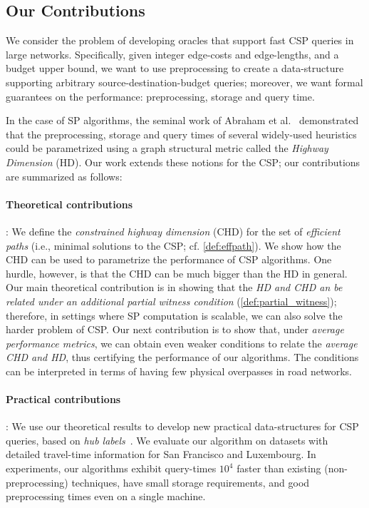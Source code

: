 \documentclass[opre,nonblindrev]{informs3} %
\begin{document}
\subsection{Our Contributions}
We consider the problem of developing oracles that support fast CSP queries in large networks. 
Specifically, given integer edge-costs and edge-lengths, and a budget upper bound, we want to use preprocessing to create a data-structure supporting arbitrary source-destination-budget queries; moreover, we want formal guarantees on the performance: preprocessing, storage and query time.

In the case of SP algorithms, the seminal work of Abraham et al.~\citep{highway2013, highway2010} demonstrated that the preprocessing, storage and query times of several widely-used heuristics could be parametrized using a graph structural metric called the \emph{Highway Dimension} (HD).
Our work extends these notions for the CSP; our contributions are summarized as follows:

\paragraph{Theoretical contributions}: 
We define the \emph{constrained highway dimension} (CHD) for the set of {\em efficient paths} (i.e., minimal solutions to the CSP; cf. \cref{def:effpath}). 
We show how the CHD can be used to parametrize the performance of CSP algorithms.
One hurdle, however, is that the CHD can be much bigger than the HD in general.
Our main theoretical contribution is in showing that the \emph{HD and CHD an be related under an additional partial witness condition} (\cref{def:partial_witness}); therefore, in settings where SP computation is scalable, we can also solve the harder problem of CSP. 
Our next contribution is to show that, under \emph{average performance metrics}, we can obtain even weaker conditions to relate the \emph{average CHD and HD}, thus certifying the performance of our algorithms.
The conditions can be interpreted in terms of having few physical overpasses in road networks.

\paragraph{Practical contributions}: 
We use our theoretical results to develop new practical data-structures for CSP queries, based on {\em hub labels}~\citep{cohen_definition_hl}. 
We evaluate our algorithm on datasets with detailed travel-time information for San Francisco and Luxembourg.
In experiments, our algorithms exhibit query-times $10^4$ faster than existing (non-preprocessing) techniques, have small storage requirements, and good preprocessing times even on a single machine. 
 
\end{document}
